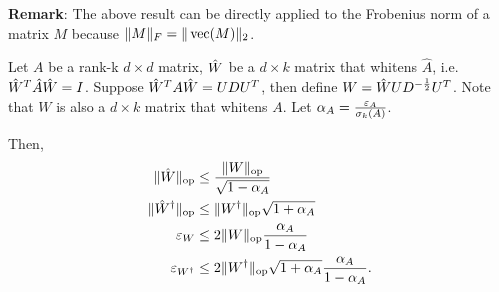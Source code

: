 
\textbf{Remark}: The above result can be directly
applied to the Frobenius norm of a matrix
$M$ because $\|M\|_F = \|\operatorname{vec}(M)\|_2$.

\begin{proposition}
  \label{prop:white}
  Let $A$ be a rank-k $d\times d$ matrix, $\hat{W}$ be a $d \times k$ matrix that
  whitens $\hat A$, i.e. $\hat{W}^T \hat{A} \hat{W} = I$.  Suppose $\hat{W}^T A \hat{W}
  = U D U^T$, then define $W = \hat{W} U D^{-\frac{1}{2}} U^T$. Note that $W$
  is also a $d \times k$ matrix that whitens $A$. Let $\alpha_{A}
  = \frac{\varepsilon_{A}}{\sigma_k(A)}$. 

  Then, 
  \begin{align*}
    \|\hat W\|_{\text{\rm op}} 
      &\le \frac{\|W\|_{\text{\rm op}}}{\sqrt{1 - \alpha_{A}} } \\
  \|{\hat W}^{\dagger}\|_{\text{\rm op}} 
    &\le \|W^{\dagger}\|_{\text{\rm op}} \sqrt{1 + \alpha_{A}} \\
    \varepsilon_{W} 
      &\le 2 \|W\|_{\text{\rm op}} \frac{\alpha_{A}}{1 - \alpha_{A}} \\
    \varepsilon_{W^{\dagger}} 
      &\le 2 \|W^{\dagger}\|_{\text{\rm op}} \sqrt{1 + \alpha_{A}} \frac{\alpha_{A}}{1 - \alpha_{A}}.
  \end{align*}
\end{proposition}

